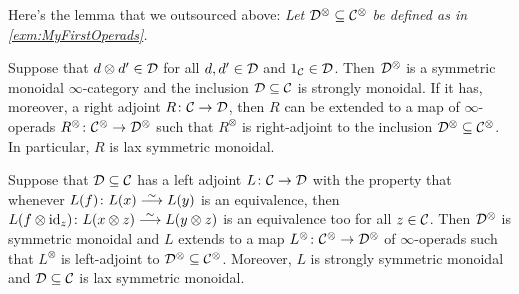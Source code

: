 \begin{exm}
\begin{alphanumerate}
	\end{alphanumerate}
\end{exm}
 Here's the lemma that we outsourced above:
\label{lem:LaxMonoidalAdjoints}\itshape
	Let $\mathcal{D}^\otimes\subseteq\mathcal{C}^\otimes$ be defined as in \cref{exm:MyFirstOperads}.
	\begin{alphanumerate}
		\item Suppose that $d\otimes d'\in \mathcal{D}$ for all $d,d'\in \mathcal{D}$ and $1_{\mathcal{C}}\in \mathcal{D}$. Then $\mathcal{D}^\otimes$ is a symmetric monoidal $\infty$-category and the inclusion $\mathcal{D}\subseteq \mathcal{C}$ is strongly monoidal. If it has, moreover, a right adjoint $R\colon \Cc\morphism\Dd$, then $R$ can be extended to a map of $\infty$-operads $R^\otimes\colon \Cc^\otimes\morphism\Dd^\otimes$ such that $R^\otimes$ is right-adjoint to the inclusion $\mathcal{D}^\otimes\subseteq \mathcal{C}^\otimes$. In particular, $R$ is lax symmetric monoidal.
		\item Suppose that $\mathcal{D}\subseteq \mathcal{C}$ has a left adjoint $L\colon \Cc\morphism\Dd$ with the property that whenever $L(f)\colon L(x)\isomorphism L(y)$ is an equivalence, then $L(f\otimes \id_z)\colon L(x\otimes z)\isomorphism L(y\otimes z)$ is an equivalence too for all $z\in\mathcal{C}$. Then $\mathcal{D}^\otimes$ is symmetric monoidal and $L$ extends to a map $L^\otimes\colon \Cc^\otimes\morphism\Dd^\otimes$ of $\infty$-operads such that $L^\otimes$ is left-adjoint to $\mathcal{D}^\otimes\subseteq \mathcal{C}^\otimes$. Moreover, $L$ is strongly symmetric monoidal and $\mathcal{D}\subseteq \mathcal{C}$ is lax symmetric monoidal.
	\end{alphanumerate}\upshape
